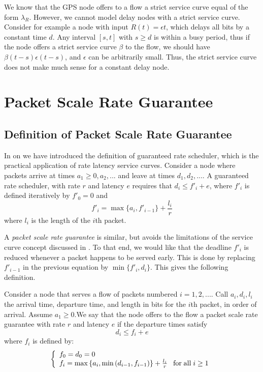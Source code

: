 We know that the GPS node offers to a flow a strict service
curve equal of the form $\lambda_{R}$. However, we cannot
model delay nodes with a strict service curve. Consider for
example a node with input $R(t)=\epsilon t$, which delays all
bits by a constant time $d$. Any interval $[s,t]$ with $s \geq
d$ is within a busy period, thus if the node offers a strict
service curve $\beta$ to the flow, we should have $\beta(t-s)
\epsilon (t-s)$, and $\epsilon$ can be arbitrarily small.
Thus, the strict service curve does not make much sense for a
constant delay node.
\section{Packet Scale Rate Guarantee}
\subsection{Definition of Packet Scale Rate
Guarantee}

In  on  we have introduced the
definition of guaranteed rate scheduler, which is the
practical application of rate latency service curves. Consider
a node where packets arrive at times $a_1\geq 0, a_2, ...$ and
leave at times $d_1, d_2, ...$. A guaranteed rate scheduler,
with rate $r$ and latency $e$ requires that $d_i \leq f'_i +
e$, where $f'_i$ is defined iteratively by $f'_0=0$ and
 $$
 f'_i=\max\{a_i, f'_{i-1}\} + \frac{l_i}{r}
 $$
where $l_i$ is the length of the $i$th packet.

A \emph{packet scale rate guarantee} is similar, but avoids
the limitations of the service curve concept discussed in
. To that end, we would like that
the deadline $f'_i$ is reduced whenever a packet happens to be
served early. This is done by replacing $f'_{i-1}$ in the
previous equation by $\min\{f'_i, d_i\}$. This gives the
following definition.
\begin{definition}
Consider a node that serves a flow of packets numbered $i=1,
2, ...$. Call $a_i, d_i, l_i$ the arrival time, departure
time, and length in bits for the $i$th packet, in order of
arrival. Assume $a_1 \geq 0$.We say that the node offers to
the flow a packet scale rate guarantee with rate $r$ and
latency $e$ if the departure times satisfy
$$d_i \leq f_i + e$$ where $f_i$ is defined by:
\begin{equation}\mylabel{eq-psrg-def}
\bracket{f_0= d_0= 0 \\
    f_i = \max \left\{
                   a_i, \min\left(d_{i-1}, f_{i-1}\right)
                 \right\}
             + \frac{l_i}{r} \gap \mfa i \geq 1
            }
\end{equation}
%
\end{definition}

